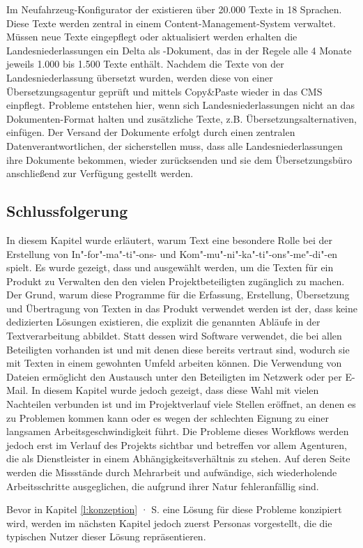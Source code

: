Im Neufahrzeug-Konfigurator der  existieren über 20.000 Texte in 18 Sprachen. Diese Texte werden zentral in einem Content-Management-System verwaltet. Müssen neue Texte eingepflegt oder aktualisiert werden erhalten die Landesniederlassungen ein Delta als -Dokument, das in der Regele alle 4 Monate jeweils 1.000 bis 1.500 Texte enthält. Nachdem die Texte von der Landesniederlassung übersetzt wurden, werden diese von einer Übersetzungsagentur geprüft und mittels Copy\&Paste wieder in das CMS einpflegt.  Probleme entstehen hier, wenn sich Landesniederlassungen nicht an das Dokumenten-Format halten und zusätzliche Texte, z.B. Übersetzungsalternativen, einfügen. Der Versand der Dokumente erfolgt durch einen zentralen Datenverantwortlichen, der sicherstellen muss, dass alle Landesniederlassungen ihre Dokumente bekommen, wieder zurücksenden und sie dem Übersetzungsbüro anschließend zur Verfügung gestellt werden.

\subsection{Schlussfolgerung}\label{l:schlussfolgerung}

In diesem Kapitel wurde erläutert, warum Text eine besondere Rolle bei der Erstellung von In"-for"-ma"-ti"-ons- und Kom"-mu"-ni"-ka"-ti"-ons"-me"-di"-en spielt. Es wurde gezeigt, dass  und  ausgewählt werden, um die Texten für ein Produkt zu Verwalten den den vielen Projektbeteiligten zugänglich zu machen. Der Grund, warum diese Programme für die Erfassung, Erstellung, Übersetzung und Übertragung von Texten in das Produkt verwendet werden ist der, dass keine  dedizierten Lösungen existieren, die explizit die genannten Abläufe in der Textverarbeitung abbildet. Statt dessen wird Software verwendet, die bei allen Beteiligten vorhanden ist und mit denen diese bereits vertraut sind, wodurch sie mit Texten in einem gewohnten Umfeld arbeiten können. Die Verwendung von Dateien ermöglicht den Austausch unter den Beteiligten im Netzwerk oder per E-Mail. In diesem Kapitel wurde jedoch gezeigt, dass diese Wahl mit vielen Nachteilen verbunden ist und im Projektverlauf viele Stellen eröffnet, an denen es zu Problemen kommen kann oder es wegen der schlechten Eignung zu einer langsamen Arbeitsgeschwindigkeit führt. Die Probleme dieses Workflows werden jedoch erst im Verlauf des Projekts sichtbar und betreffen vor allem Agenturen, die als Dienstleister in einem Abhängigkeitsverhältnis zu stehen. Auf deren Seite werden die Missstände durch Mehrarbeit und aufwändige, sich wiederholende Arbeitsschritte ausgeglichen, die aufgrund ihrer Natur fehleranfällig sind.

\secbar

Bevor in Kapitel \ref{l:konzeption} · S.\pageref{l:konzeption} eine Lösung für diese Probleme konzipiert wird, werden im nächsten Kapitel jedoch zuerst Personas vorgestellt, die die typischen Nutzer dieser Lösung repräsentieren.

\pagebreak